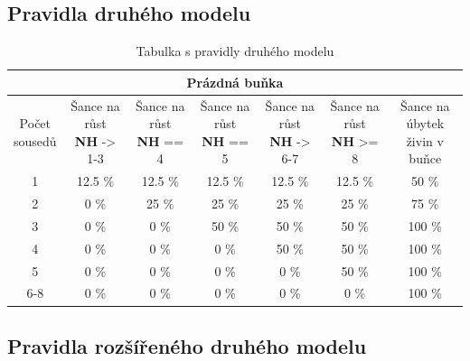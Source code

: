 \documentclass{article}
\begin{document}
\subsection{Pravidla druhého modelu}
\begin{table}[ht]
    \centering
    \begin{tabular}{|c|c|c|c|c|c|c|} \hline
        \multicolumn{7}{|c|}{\textbf{Prázdná buňka}} \\ \hline
        \thead{Počet \\ sousedů} & \thead{Šance na růst \\ \textbf{NH} -> 1-3} & \thead{Šance na růst \\ \textbf{NH} == 4} & \thead{Šance na růst \\ \textbf{NH} == 5 } & \thead{Šance na růst \\ \textbf{NH} -> 6-7} & \thead{Šance na růst \\ \textbf{NH} >= 8} & \thead{Šance na úbytek \\ živin v buňce} \\ \hline
                1   &  12.5 \%   &   12.5 \%   &   12.5 \%  &   12.5 \%  &  12.5 \%  &   50 \%   \\ \hline
                2   &     0 \%   &     25 \%   &     25 \%  &     25 \%  &    25 \%  &   75 \%   \\ \hline
                3   &     0 \%   &      0 \%   &     50 \%  &     50 \%  &    50 \%  &  100 \%   \\ \hline
                4   &     0 \%   &      0 \%   &      0 \%  &     50 \%  &    50 \%  &  100 \%   \\ \hline
                5   &     0 \%   &      0 \%   &      0 \%  &      0 \%  &    50 \%  &  100 \%   \\ \hline
               6-8  &     0 \%   &      0 \%   &      0 \%  &      0 \%  &     0 \%  &  100 \%   \\ \hline
    \end{tabular}
    \caption{Tabulka s pravidly druhého modelu}
    \label{model2table}
\end{table}

\subsection{Pravidla rozšířeného druhého modelu}
\end{document}
